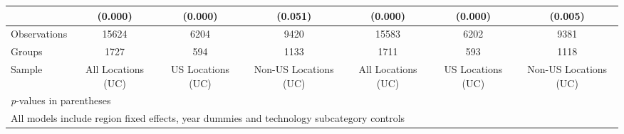 \begin{table}[htbp]
\begin{tabular}{l*{6}{c}}
                &  (0.000)&  (0.000)&  (0.051)&  (0.000)&  (0.000)&  (0.005)\\
\hline
Observations    &    15624&     6204&     9420&    15583&     6202&     9381\\
Groups          &     1727&      594&     1133&     1711&      593&     1118\\
Sample          &All Locations (UC)&US Locations (UC)&Non-US Locations (UC)&All Locations (UC)&US Locations (UC)&Non-US Locations (UC)\\
\hline\hline
\multicolumn{7}{l}{\footnotesize \textit{p}-values in parentheses}\\
\multicolumn{7}{l}{\footnotesize All models include region fixed effects, year dummies and technology subcategory controls}\\
\end{tabular}
\end{table}
